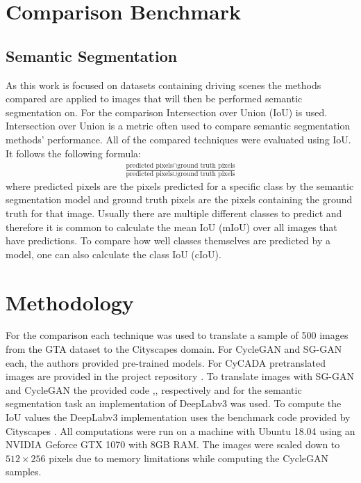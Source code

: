 \section{Comparison Benchmark}
\subsection{Semantic Segmentation}
As this work is focused on datasets containing driving scenes the methods compared are applied to images that will then be performed semantic segmentation on. For the comparison Intersection over Union (IoU) is used. Intersection over Union is a metric often used to compare semantic segmentation methods' performance. All of the compared techniques were evaluated using IoU. It follows the following formula:
\begin{align*}
	\frac{\text{predicted pixels} \cap \text{ground truth pixels}}{\text{predicted pixels} \cup \text{ground truth pixels}}
\end{align*}
where predicted pixels are the pixels predicted for a specific class by the semantic segmentation model and ground truth pixels are the pixels containing the ground truth for that image. Usually there are multiple different classes to predict and therefore it is common to calculate the mean IoU (mIoU) over all images that have predictions. To compare how well classes themselves are predicted by a model, one can also calculate the class IoU (cIoU).

\section{Methodology}
For the comparison each technique was used to translate a sample of 500 images from the GTA dataset to the Cityscapes domain. For CycleGAN and SG-GAN each, the authors provided pre-trained models. For CyCADA pretranslated images are provided in the project repository \cite{CyCADA}. To translate images with SG-GAN and CycleGAN the provided code \cite{SG},\cite{Cycle}, respectively and for the semantic segmentation task an implementation \cite{DLR} of DeepLabv3 \cite{DBLP:journals/corr/ChenPSA17} was used. To compute the IoU values the DeepLabv3 implementation uses the benchmark code provided by Cityscapes \cite{CSR}. All computations were run on a machine with Ubuntu 18.04 using an NVIDIA Geforce GTX 1070 with 8GB RAM. The images were scaled down to $512 \times 256$ pixels due to memory limitations while computing the CycleGAN samples.

\newpage

